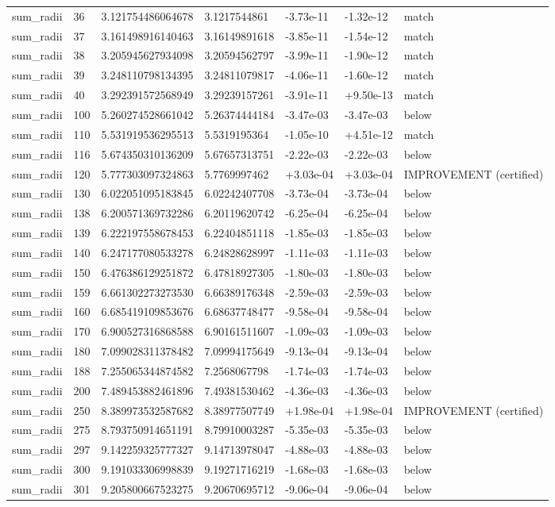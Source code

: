 \begin{longtable}{lllllll}
sum\_radii & 36 & 3.121754486064678 & 3.1217544861 & -3.73e-11 & -1.32e-12 & match \\
sum\_radii & 37 & 3.161498916140463 & 3.16149891618 & -3.85e-11 & -1.54e-12 & match \\
sum\_radii & 38 & 3.205945627934098 & 3.20594562797 & -3.99e-11 & -1.90e-12 & match \\
sum\_radii & 39 & 3.248110798134395 & 3.24811079817 & -4.06e-11 & -1.60e-12 & match \\
sum\_radii & 40 & 3.292391572568949 & 3.29239157261 & -3.91e-11 & +9.50e-13 & match \\
sum\_radii & 100 & 5.260274528661042 & 5.26374444184 & -3.47e-03 & -3.47e-03 & below \\
sum\_radii & 110 & 5.531919536295513 & 5.5319195364 & -1.05e-10 & +4.51e-12 & match \\
sum\_radii & 116 & 5.674350310136209 & 5.67657313751 & -2.22e-03 & -2.22e-03 & below \\
sum\_radii & 120 & 5.777303097324863 & 5.7769997462 & +3.03e-04 & +3.03e-04 & IMPROVEMENT (certified) \\
sum\_radii & 130 & 6.022051095183845 & 6.02242407708 & -3.73e-04 & -3.73e-04 & below \\
sum\_radii & 138 & 6.200571369732286 & 6.20119620742 & -6.25e-04 & -6.25e-04 & below \\
sum\_radii & 139 & 6.222197558678453 & 6.22404851118 & -1.85e-03 & -1.85e-03 & below \\
sum\_radii & 140 & 6.247177080533278 & 6.24828628997 & -1.11e-03 & -1.11e-03 & below \\
sum\_radii & 150 & 6.476386129251872 & 6.47818927305 & -1.80e-03 & -1.80e-03 & below \\
sum\_radii & 159 & 6.661302273273530 & 6.66389176348 & -2.59e-03 & -2.59e-03 & below \\
sum\_radii & 160 & 6.685419109853676 & 6.68637748477 & -9.58e-04 & -9.58e-04 & below \\
sum\_radii & 170 & 6.900527316868588 & 6.90161511607 & -1.09e-03 & -1.09e-03 & below \\
sum\_radii & 180 & 7.099028311378482 & 7.09994175649 & -9.13e-04 & -9.13e-04 & below \\
sum\_radii & 188 & 7.255065344874582 & 7.2568067798 & -1.74e-03 & -1.74e-03 & below \\
sum\_radii & 200 & 7.489453882461896 & 7.49381530462 & -4.36e-03 & -4.36e-03 & below \\
sum\_radii & 250 & 8.389973532587682 & 8.38977507749 & +1.98e-04 & +1.98e-04 & IMPROVEMENT (certified) \\
sum\_radii & 275 & 8.793750914651191 & 8.79910003287 & -5.35e-03 & -5.35e-03 & below \\
sum\_radii & 297 & 9.142259325777327 & 9.14713978047 & -4.88e-03 & -4.88e-03 & below \\
sum\_radii & 300 & 9.191033306998839 & 9.19271716219 & -1.68e-03 & -1.68e-03 & below \\
sum\_radii & 301 & 9.205800667523275 & 9.20670695712 & -9.06e-04 & -9.06e-04 & below \\
\hline
\end{longtable}
